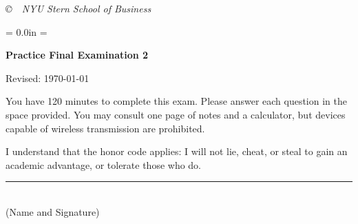 \documentclass[letterpaper,12pt]{exam}
\def\HeadName{Practice Final Examination 1}
\begin{document}
\vfill \centerline{\it \copyright \ \number\year \
NYU Stern School of Business}



\newpage
\def\HeadName{Practice Final Examination 2}
\parindent = 0.0in
\parskip = \bigskipamount
\setcounter{page}{1} \thispagestyle{empty}
\Head

\centerline{\large \bf \HeadName}%
\centerline{Revised:  \today}

\bigskip
You have 120 minutes to complete this exam.  Please answer each
question in the space provided. You may consult one page of notes
and a calculator, but devices capable of wireless transmission are
prohibited.

I understand that the honor code applies: I will not lie, cheat,
or steal to gain an academic advantage, or tolerate those who do.

\begin{flushright}
\rule{4in}{0.5pt} \\ (Name and Signature)
\end{flushright}
\end{document}

